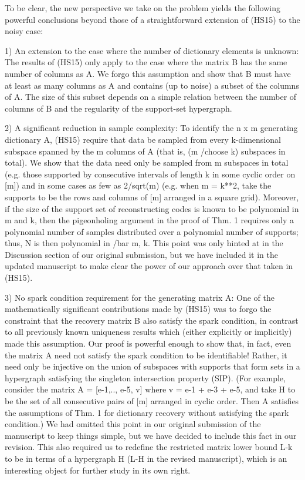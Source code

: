 To be clear, the new perspective we take on the problem yields the following powerful conclusions beyond those of a straightforward extension of (HS15) to the noisy case:

1) An extension to the case where the number of dictionary elements is unknown: The results of (HS15) only apply to the case where the matrix B has the same number of columns as A. We forgo this assumption and show that B must have at least as many columns as A and contains (up to noise) a subset of the columns of A. The size of this subset depends on a simple relation between the number of columns of B and the regularity of the support-set hypergraph.

2) A significant reduction in sample complexity: To identify the n x m generating dictionary A, (HS15) require that data be sampled from every k-dimensional subspace spanned by the m columns of A (that is, (m /choose k) subspaces in total). We show that the data need only be sampled from m subspaces in total (e.g. those supported by consecutive intervals of length k in some cyclic order on [m]) and in some cases as few as 2/sqrt(m) (e.g. when m = k**2, take the supports to be the rows and columns of [m] arranged in a square grid). Moreover, if the size of the support set of reconstructing codes is known to be polynomial in m and k, then the pigeonholing argument in the proof of Thm. 1 requires only a polynomial number of samples distributed over a polynomial number of supports; thus, N is then polynomial in /bar m, k. This point was only hinted at in the Discussion section of our original submission, but we have included it in the updated manuscript to make clear the power of our approach over that taken in (HS15). 

3) No spark condition requirement for the generating matrix A: One of the mathematically significant contributions made by (HS15) was to forgo the constraint that the recovery matrix B also satisfy the spark condition, in contrast to all previously known uniqueness results which (either explicitly or implicitly) made this assumption.  Our proof is powerful enough to show that, in fact, even the matrix A need not satisfy the spark condition to be identifiable! Rather, it need only be injective on the union of subspaces with supports that form sets in a hypergraph satisfying the singleton intersection property (SIP). (For example, consider the matrix A = [e-1,.., e-5, v] where v = e-1 + e-3 + e-5, and take H to be the set of all consecutive pairs of [m] arranged in cyclic order. Then A satisfies the assumptions of Thm. 1 for dictionary recovery without satisfying the spark condition.) We had omitted this point in our original submission of the manuscript to keep things simple, but we have decided to include this fact in our revision. This also required us to redefine the restricted matrix lower bound L-k to be in terms of a hypergraph H (L-H in the revised manuscript), which is an interesting object for further study in its own right. 

